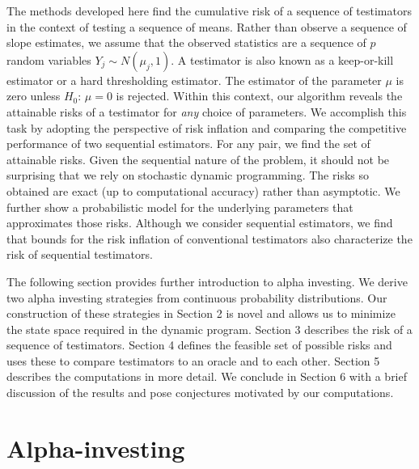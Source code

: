\documentclass{gSCS2e}
\begin{document}
 
 The methods developed here find the cumulative risk of a sequence of testimators in the
 context of testing a sequence of means.  Rather than observe a sequence of slope
 estimates, we assume that the observed statistics are a sequence of $p$ random variables
 $Y_j \sim N(\mu_j,1)$.  A testimator is also known as a keep-or-kill estimator or a hard
 thresholding estimator.  The estimator of the parameter $\mu$ is zero unless $H_0: \,\mu
 = 0$ is rejected.  Within this context, our algorithm reveals the attainable risks of a
 testimator for {\em any} choice of parameters.  We accomplish this task by adopting the
 perspective of risk inflation and comparing the competitive performance of two sequential
 estimators.  For any pair, we find the set of attainable risks.  Given the sequential
 nature of the problem, it should not be surprising that we rely on stochastic dynamic
 programming.  The risks so obtained are exact (up to computational accuracy) rather than
 asymptotic.  We further show a probabilistic model for the underlying parameters that
 approximates those risks.  Although we consider sequential estimators, we find that
 bounds for the risk inflation of conventional testimators also characterize the risk of
 sequential testimators.


 The following section provides further introduction to alpha investing.  We
 derive two alpha investing strategies from continuous probability
 distributions.  Our construction of these strategies in Section 2 is novel and
 allows us to minimize the state space required in the dynamic program.  Section
 3 describes the risk of a sequence of testimators.  Section 4 defines the
 feasible set of possible risks and uses these to compare
 testimators to an oracle and to each other.  Section 5 describes the
 computations in more detail.  We conclude in Section 6 with a brief discussion
 of the results and pose conjectures motivated by our computations.



\section{ Alpha-investing }
\end{document}
